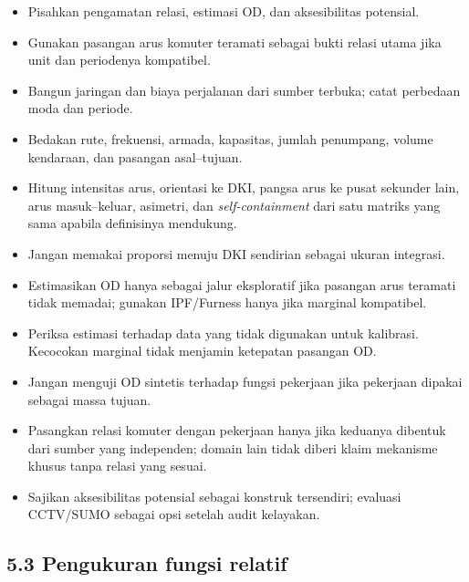 \documentclass[
  indonesian,
  11pt,
]{article}
\providecommand{\tightlist}{%
  \setlength{\itemsep}{0pt}\setlength{\parskip}{0pt}}
\renewcommand{\tightlist}{%
  \setlength{\itemsep}{0.22em}%
  \setlength{\parskip}{0pt}%
}
\begin{document}
\begin{itemize}
\tightlist
\item[$\square$]
  Pisahkan pengamatan relasi, estimasi OD, dan aksesibilitas potensial.
\item[$\square$]
  Gunakan pasangan arus komuter teramati sebagai bukti relasi utama
  jika unit dan periodenya kompatibel.
\item[$\square$]
  Bangun jaringan dan biaya perjalanan dari sumber terbuka; catat
  perbedaan moda dan periode.
\item[$\square$]
  Bedakan rute, frekuensi, armada, kapasitas, jumlah penumpang, volume
  kendaraan, dan pasangan asal--tujuan.
\item[$\square$]
  Hitung intensitas arus, orientasi ke DKI, pangsa arus ke pusat
  sekunder lain, arus masuk--keluar, asimetri, dan
  \emph{self-containment} dari satu matriks yang sama apabila
  definisinya mendukung.
\item[$\square$]
  Jangan memakai proporsi menuju DKI sendirian sebagai ukuran
  integrasi.
\item[$\square$]
  Estimasikan OD hanya sebagai jalur eksploratif jika pasangan arus
  teramati tidak memadai; gunakan IPF/Furness hanya jika marginal
  kompatibel.
\item[$\square$]
  Periksa estimasi terhadap data yang tidak digunakan untuk kalibrasi.
  Kecocokan marginal tidak menjamin ketepatan pasangan OD.
\item[$\square$]
  Jangan menguji OD sintetis terhadap fungsi pekerjaan jika pekerjaan
  dipakai sebagai massa tujuan.
\item[$\square$]
  Pasangkan relasi komuter dengan pekerjaan hanya jika keduanya dibentuk
  dari sumber yang independen; domain lain tidak diberi klaim mekanisme
  khusus tanpa relasi yang sesuai.
\item[$\square$]
  Sajikan aksesibilitas potensial sebagai konstruk tersendiri; evaluasi
  CCTV/SUMO sebagai opsi setelah audit kelayakan.
\end{itemize}

\subsection{5.3 Pengukuran fungsi
relatif}\label{pengukuran-fungsi-relatif}
\end{document}

